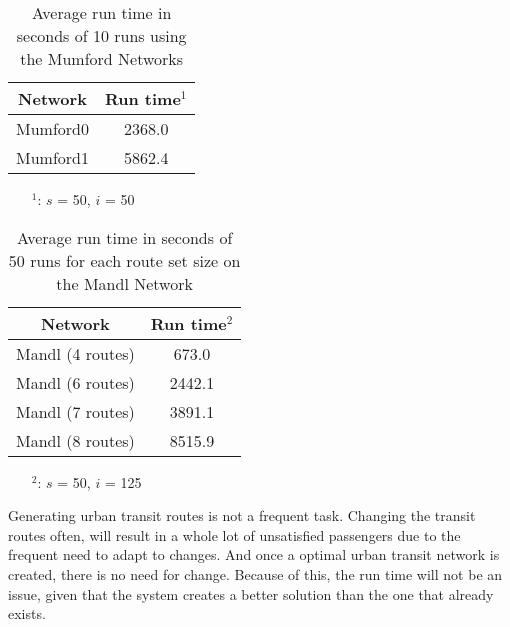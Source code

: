 
\begin{table}[H]
    \centering
    \hspace*{-1.0cm}
    \begin{tabular}{|c|c|}
        \hline
        \textbf{Network} & \textbf{Run time$^1$ } \\
        \hline
        Mumford0 & 2368.0\\
        
        Mumford1 & 5862.4\\
        \hline
    \end{tabular}
    \caption{Average run time in seconds of 10 runs using the Mumford Networks}
    \label{tabel:runTimeMumford}
    \begin{itemize}[noitemsep]
    \item[$^1$:] $s$ = 50, $i$ = 50
    \end{itemize} 
\end{table}

\begin{table}[H]
    \centering
    \hspace*{-1.0cm}
    \begin{tabular}{|c|c|}
        \hline
        \textbf{Network} & \textbf{Run time$^2$}\\
        \hline
        Mandl (4 routes) & 673.0\\
        
        Mandl (6 routes) & 2442.1\\
      
        Mandl (7 routes) & 3891.1\\
       
        Mandl (8 routes) & 8515.9\\
        \hline
    \end{tabular}
    \caption{Average run time in seconds of 50 runs for each route set size on the Mandl Network}
    \begin{itemize}[noitemsep]
    \item[$^2$:] $s$ = 50, $i$ = 125
    \end{itemize} 
    \label{tabel:runTimeMandl}
\end{table}

Generating urban transit routes is not a frequent task. Changing the transit routes often, will result in a whole lot of unsatisfied passengers due to the frequent need to adapt to changes. And once a optimal urban transit network is created, there is no need for change. Because of this, the run time will not be an issue, given that the system creates a better solution than the one that already exists. 